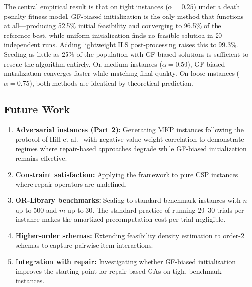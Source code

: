 \documentclass[twocolumn]{article}
\begin{document}
The central empirical result is that on tight instances ($\alpha = 0.25$) 
under a death penalty fitness model, GF-biased initialization is the 
only method that functions at all---producing 52.5\% initial feasibility 
and converging to 96.5\% of the reference best, while uniform 
initialization finds no feasible solution in 20 independent runs. 
Adding lightweight ILS post-processing raises this to 99.3\%. Seeding 
as little as 25\% of the population with GF-biased solutions is 
sufficient to rescue the algorithm entirely. On medium instances 
($\alpha = 0.50$), GF-biased initialization converges faster while 
matching final quality. On loose instances ($\alpha = 0.75$), both 
methods are identical by theoretical prediction.

\subsection{Future Work}
\label{sec:futurework}

\begin{enumerate}
    \item \textbf{Adversarial instances (Part 2):} Generating MKP instances 
    following the protocol of Hill et al.~\cite{hill2012test} with negative 
    value-weight correlation to demonstrate regimes where repair-based 
    approaches degrade while GF-biased initialization remains effective.
    \item \textbf{Constraint satisfaction:} Applying the framework to 
    pure CSP instances where repair operators are undefined.
    \item \textbf{OR-Library benchmarks:} Scaling to standard benchmark 
    instances with $n$ up to 500 and $m$ up to 30. The standard practice 
    of running 20--30 trials per instance makes the amortized precomputation 
    cost per trial negligible.
    \item \textbf{Higher-order schemas:} Extending feasibility density 
    estimation to order-2 schemas to capture pairwise item interactions.
    \item \textbf{Integration with repair:} Investigating whether 
    GF-biased initialization improves the starting point for repair-based 
    GAs on tight benchmark instances.
\end{enumerate}
\end{document}
